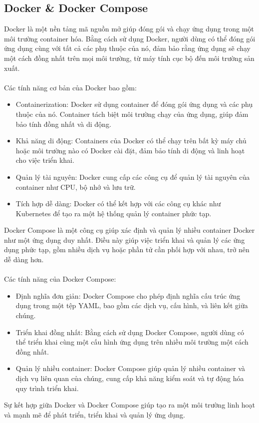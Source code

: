 \subsection{Docker \& Docker Compose}
Docker là một nền tảng mã nguồn mở giúp đóng gói và chạy ứng dụng trong một môi trường container hóa. Bằng cách sử dụng Docker, người dùng có thể đóng gói ứng dụng cùng với tất cả các phụ thuộc của nó, đảm bảo rằng ứng dụng sẽ chạy một cách đồng nhất trên mọi môi trường, từ máy tính cục bộ đến môi trường sản xuất.\\
\\
Các tính năng cơ bản của Docker bao gồm:
\begin{itemize}
    \item Containerization: Docker sử dụng container để đóng gói ứng dụng và các phụ thuộc của nó. Container tách biệt môi trường chạy của ứng dụng, giúp đảm bảo tính đồng nhất và di động.

    \item Khả năng di động: Containers của Docker có thể chạy trên bất kỳ máy chủ hoặc môi trường nào có Docker cài đặt, đảm bảo tính di động và linh hoạt cho việc triển khai.

    \item Quản lý tài nguyên: Docker cung cấp các công cụ để quản lý tài nguyên của container như CPU, bộ nhớ và lưu trữ.

    \item Tích hợp dễ dàng: Docker có thể kết hợp với các công cụ khác như Kubernetes để tạo ra một hệ thống quản lý container phức tạp.
\end{itemize}
Docker Compose là một công cụ giúp xác định và quản lý nhiều container Docker như một ứng dụng duy nhất. Điều này giúp việc triển khai và quản lý các ứng dụng phức tạp, gồm nhiều dịch vụ hoặc phần tử cần phối hợp với nhau, trở nên dễ dàng hơn.\\
\\
Các tính năng của Docker Compose:
\begin{itemize}
\item Định nghĩa đơn giản: Docker Compose cho phép định nghĩa cấu trúc ứng dụng trong một tệp YAML, bao gồm các dịch vụ, cấu hình, và liên kết giữa chúng.

\item Triển khai đồng nhất: Bằng cách sử dụng Docker Compose, người dùng có thể triển khai cùng một cấu hình ứng dụng trên nhiều môi trường một cách đồng nhất.

\item Quản lý nhiều container: Docker Compose giúp quản lý nhiều container và dịch vụ liên quan của chúng, cung cấp khả năng kiểm soát và tự động hóa quy trình triển khai.
\end{itemize}
Sự kết hợp giữa Docker và Docker Compose giúp tạo ra một môi trường linh hoạt và mạnh mẽ để phát triển, triển khai và quản lý ứng dụng.
